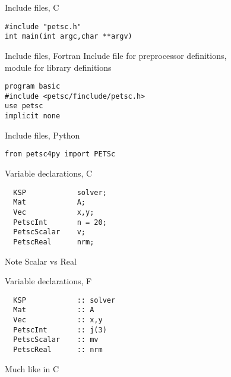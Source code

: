 

\begin{c}
\begin{numberedframe}{Include files, C}
\lstset{language=C}
\begin{lstlisting}
#include "petsc.h"
int main(int argc,char **argv)
\end{lstlisting}
\end{numberedframe}
\end{c}

\begin{fortran}
\lstset{language=Fortran}
\begin{numberedframe}{Include files, Fortran}
  Include file for preprocessor definitions,\\
  module for library definitions
\begin{lstlisting}
program basic
#include <petsc/finclude/petsc.h>
use petsc
implicit none
\end{lstlisting}
\end{numberedframe}
\end{fortran}

\begin{python}
\begin{numberedframe}{Include files, Python}
\lstset{language=Python}
\begin{lstlisting}
from petsc4py import PETSc
\end{lstlisting}
\end{numberedframe}
\end{python}

\lstset{language=C}
\begin{c}
\begin{numberedframe}{Variable declarations, C}
\begin{lstlisting}
  KSP            solver;
  Mat            A;
  Vec            x,y;
  PetscInt       n = 20;
  PetscScalar    v;
  PetscReal      nrm;
\end{lstlisting}
Note Scalar vs Real
\end{numberedframe}
\end{c}

\lstset{language=Fortran}
\begin{fortran}
\begin{numberedframe}{Variable declarations, F}
\begin{lstlisting}
  KSP            :: solver
  Mat            :: A
  Vec            :: x,y
  PetscInt       :: j(3)
  PetscScalar    :: mv
  PetscReal      :: nrm
\end{lstlisting}
Much like in C
\end{numberedframe}
\end{fortran}


